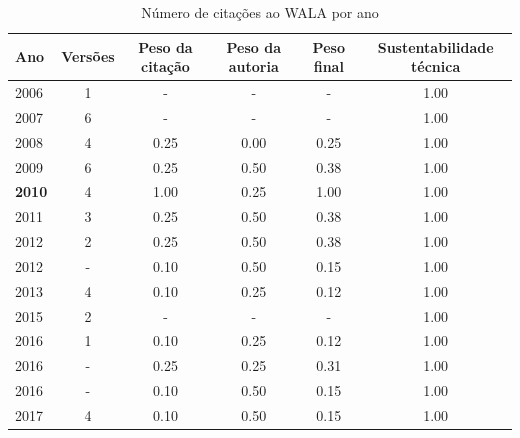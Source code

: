 \begin{table}[H]
\caption{Número de citações ao WALA por ano}
\centering
\begin{tabular}{| l | c | c | c | c | c |}
  \hline
  Ano & Versões & Peso da citação & Peso da autoria & Peso final & Sustentabilidade técnica \\
  \hline
        2006 & 1 & - & - & -
        &
          {\color{blue} 1.00}
        \\
\hline
        2007 & 6 & - & - & -
        &
          {\color{blue} 1.00}
        \\
\hline
            2008
          &
          4
          &
          0.25
          &
          0.00
          &
          0.25
          &
            {\color{blue} 1.00}
          \\
\hline
            2009
          &
          6
          &
          0.25
          &
          0.50
          &
          0.38
          &
            {\color{blue} 1.00}
          \\
\hline
            {\bf 2010}
          &
          4
          &
          1.00
          &
          0.25
          &
          1.00
          &
            {\color{blue} 1.00}
          \\
\hline
            2011
          &
          3
          &
          0.25
          &
          0.50
          &
          0.38
          &
            {\color{blue} 1.00}
          \\
\hline
            2012
          &
          2
          &
          0.25
          &
          0.50
          &
          0.38
          &
            {\color{blue} 1.00}
          \\
            2012
          &
          -
          &
          0.10
          &
          0.50
          &
          0.15
          &
            {\color{blue} 1.00}
          \\
\hline
            2013
          &
          4
          &
          0.10
          &
          0.25
          &
          0.12
          &
            {\color{blue} 1.00}
          \\
\hline
        2015 & 2 & - & - & -
        &
          {\color{blue} 1.00}
        \\
\hline
            2016
          &
          1
          &
          0.10
          &
          0.25
          &
          0.12
          &
            {\color{blue} 1.00}
          \\
            2016
          &
          -
          &
          0.25
          &
          0.25
          &
          0.31
          &
            {\color{blue} 1.00}
          \\
            2016
          &
          -
          &
          0.10
          &
          0.50
          &
          0.15
          &
            {\color{blue} 1.00}
          \\
\hline
            2017
          &
          4
          &
          0.10
          &
          0.50
          &
          0.15
          &
            {\color{blue} 1.00}
          \\
\hline
\end{tabular}
\end{table}



